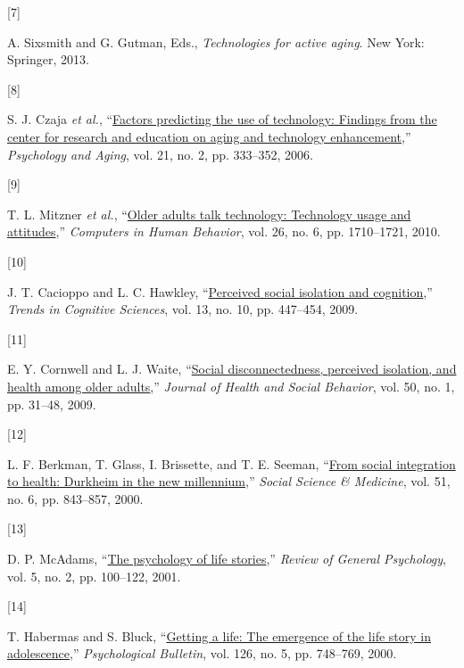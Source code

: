 \documentclass[
  journal,
]{IEEEtran}%
\newlength{\cslhangindent}
\newlength{\csllabelwidth}
\newenvironment{CSLReferences}[2] %
 {\begin{list}{}{%
  \setlength{\itemindent}{0pt}
  \setlength{\leftmargin}{0pt}
  \setlength{\parsep}{0pt}
  \ifodd #1
   \setlength{\leftmargin}{\cslhangindent}
   \setlength{\itemindent}{-1\cslhangindent}
  \fi
  \setlength{\itemsep}{#2\baselineskip}}}
 {\end{list}}
\newcommand{\CSLLeftMargin}[1]{\parbox[t]{\csllabelwidth}{\strut#1\strut}}
\newcommand{\CSLRightInline}[1]{\parbox[t]{\linewidth - \csllabelwidth}{\strut#1\strut}}
\begin{document}
\begin{CSLReferences}{0}{0}
\CSLLeftMargin{{[}7{]} }%
\CSLRightInline{A. Sixsmith and G. Gutman, Eds., \emph{Technologies for
active aging}. New York: Springer, 2013. }

\CSLLeftMargin{{[}8{]} }%
\CSLRightInline{S. J. Czaja \emph{et al.},
{``\href{https://doi.org/10.1037/0882-7974.21.2.333}{Factors predicting
the use of technology: Findings from the center for research and
education on aging and technology enhancement},''} \emph{Psychology and
Aging}, vol. 21, no. 2, pp. 333--352, 2006. }

\CSLLeftMargin{{[}9{]} }%
\CSLRightInline{T. L. Mitzner \emph{et al.},
{``\href{https://doi.org/10.1016/j.chb.2010.06.020}{Older adults talk
technology: Technology usage and attitudes},''} \emph{Computers in Human
Behavior}, vol. 26, no. 6, pp. 1710--1721, 2010. }

\CSLLeftMargin{{[}10{]} }%
\CSLRightInline{J. T. Cacioppo and L. C. Hawkley,
{``\href{https://doi.org/10.1016/j.tics.2009.06.005}{Perceived social
isolation and cognition},''} \emph{Trends in Cognitive Sciences}, vol.
13, no. 10, pp. 447--454, 2009. }

\CSLLeftMargin{{[}11{]} }%
\CSLRightInline{E. Y. Cornwell and L. J. Waite,
{``\href{https://doi.org/10.1177/002214650905000103}{Social
disconnectedness, perceived isolation, and health among older
adults},''} \emph{Journal of Health and Social Behavior}, vol. 50, no.
1, pp. 31--48, 2009. }

\CSLLeftMargin{{[}12{]} }%
\CSLRightInline{L. F. Berkman, T. Glass, I. Brissette, and T. E. Seeman,
{``\href{https://doi.org/10.1016/S0277-9536(00)00065-4}{From social
integration to health: Durkheim in the new millennium},''} \emph{Social
Science \& Medicine}, vol. 51, no. 6, pp. 843--857, 2000. }

\CSLLeftMargin{{[}13{]} }%
\CSLRightInline{D. P. McAdams,
{``\href{https://doi.org/10.1037/1089-2680.5.2.100}{The psychology of
life stories},''} \emph{Review of General Psychology}, vol. 5, no. 2,
pp. 100--122, 2001. }

\CSLLeftMargin{{[}14{]} }%
\CSLRightInline{T. Habermas and S. Bluck,
{``\href{https://doi.org/10.1037/0033-2909.126.5.748}{Getting a life:
The emergence of the life story in adolescence},''} \emph{Psychological
Bulletin}, vol. 126, no. 5, pp. 748--769, 2000. }


\end{CSLReferences}
\end{document}
